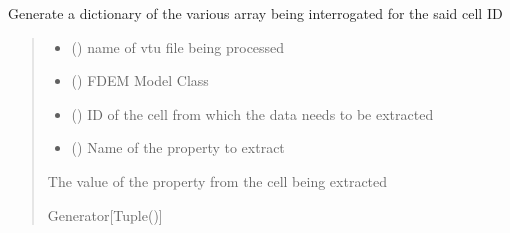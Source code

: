 \documentclass[letterpaper,10pt,english]{sphinxmanual}
\begin{document}
\begin{fulllineitems}
\label{\detokenize{pyfdempp:pyfdempp.extract_cell_thread_pool_generators.history_cellinfo_func}}
\pysigstartsignatures
{}
\pysigstopsignatures
\sphinxAtStartPar
Generate a dictionary of the various array being interrogated for the said cell ID
\begin{quote}\begin{description}
\begin{itemize}
\item {} 
\sphinxAtStartPar
{} () \textendash{} name of vtu file being processed

\item {} 
\sphinxAtStartPar
{} () \textendash{} FDEM Model Class

\item {} 
\sphinxAtStartPar
{} () \textendash{} ID of the cell from which the data needs to be extracted

\item {} 
\sphinxAtStartPar
{} (\sphinxstyleliteralemphasis{\sphinxupquote{{[}}}\sphinxstyleliteralemphasis{\sphinxupquote{{]}}}) \textendash{} Name of the property to extract

\end{itemize}

\sphinxAtStartPar
The value of the property from the cell being extracted

\sphinxAtStartPar
Generator{[}Tuple(){]}

\end{description}\end{quote}

\end{fulllineitems}
\end{document}
